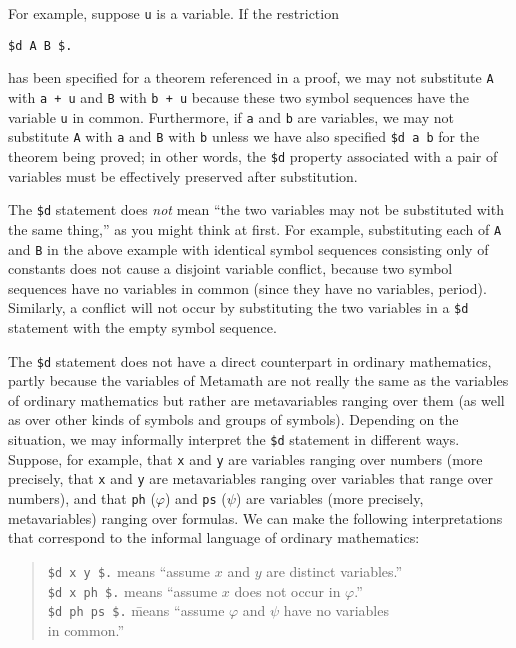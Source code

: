 For example, suppose \texttt{u} is a variable.  If the restriction
\begin{center}
  \texttt{\$d A B \$.}
\end{center}
has been specified for a theorem referenced in a
proof, we may not substitute \texttt{A} with \mbox{\tt a + u} and
\texttt{B} with \mbox{\tt b + u} because these two symbol sequences have the
variable \texttt{u} in common.  Furthermore, if \texttt{a} and \texttt{b} are
variables, we may not substitute \texttt{A} with \texttt{a} and \texttt{B} with \texttt{b}
unless we have also specified \texttt{\$d a b} for the theorem being proved; in
other words, the \texttt{\$d} property associated with a pair of variables must
be effectively preserved after substitution.

The \texttt{\$d} statement does {\em not} mean ``the
two variables may not be substituted with the same thing,'' as you might think
at first.  For example, substituting each of \texttt{A} and \texttt{B} in the above
example with identical symbol sequences consisting only of constants does not
cause a disjoint variable conflict, because two symbol sequences have no
variables in common (since they have no variables, period).  Similarly, a
conflict will not occur by substituting the two variables in a \texttt{\$d}
statement with the empty symbol sequence.

The \texttt{\$d} statement does not have a direct counterpart in
ordinary mathematics, partly because the variables of
Metamath are not really the same as the variables of ordinary mathematics but rather are
metavariables ranging over them (as well as over
other kinds of symbols and groups of symbols).  Depending on the
situation, we may informally interpret the \texttt{\$d} statement in
different ways.  Suppose, for example, that \texttt{x} and \texttt{y}
are variables ranging over numbers (more precisely, that \texttt{x} and
\texttt{y} are metavariables ranging over variables that range over
numbers), and that \texttt{ph} ($\varphi$) and \texttt{ps} ($\psi$) are
variables (more precisely, metavariables) ranging over formulas.  We can
make the following interpretations that correspond to the informal
language of ordinary mathematics:
\begin{quote}
\begin{tabbing}
\texttt{\$d x y \$.} means ``assume $x$ and $y$ are
distinct variables.''\\
\texttt{\$d x ph \$.} means ``assume $x$ does not
occur in $\varphi$.''\\
\texttt{\$d ph ps \$.} \=means ``assume $\varphi$ and
$\psi$ have no variables\\ \>in common.''
\end{tabbing}
\end{quote}

